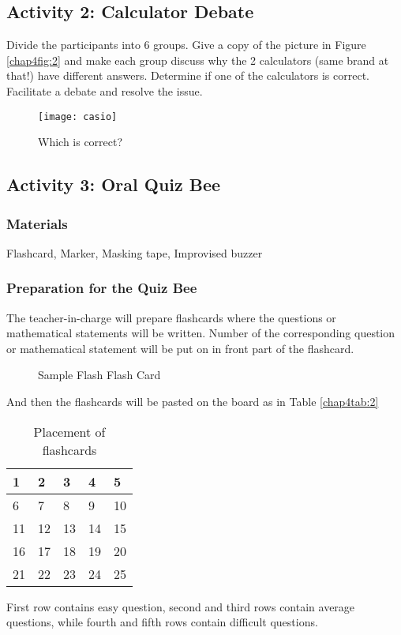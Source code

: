 \subsection*{Activity 2: Calculator Debate}
Divide the participants into 6 groups. Give a copy of the picture in Figure \eqref{chap4fig:2} and make each
group discuss why the 2 calculators (same brand at that!) have different
answers. Determine if one of the calculators is correct. Facilitate a debate and
resolve the issue.

\begin{figure}[!h]
\centering
\caption{Which is correct?}
\texttt{[image: casio]}
\label{chap4fig:2}
\end{figure}
\subsection*{Activity 3: Oral Quiz Bee}
\subsubsection*{Materials}
Flashcard, Marker, Masking tape, Improvised buzzer
\subsubsection*{Preparation for the Quiz Bee}
The teacher-in-charge will prepare flashcards where the questions or mathematical statements will
be written. Number of the corresponding question or mathematical statement will be put on in front
part of the flashcard.
\begin{figure}[!h]
\centering
\caption{Sample Flash Flash Card}
\qquad
{}%
\end{figure}
And then the flashcards will be pasted on the board as in Table \eqref{chap4tab:2}
\begin{table}[!h]
\centering
\caption{Placement of flashcards}
\begin{tabular}{|l|l|l|l|l|}
\hline
1 & 2 & 3 & 4 & 5\\ \hline
6 & 7 & 8 & 9 & 10\\ \hline
11 & 12 & 13 & 14 & 15\\ \hline
16 & 17 & 18 & 19 & 20\\ \hline
21 & 22 & 23 & 24 & 25\\ \hline
\end{tabular}
\end{table}
First row contains easy question, second and third rows contain average questions, while fourth and
fifth rows contain difficult questions.
